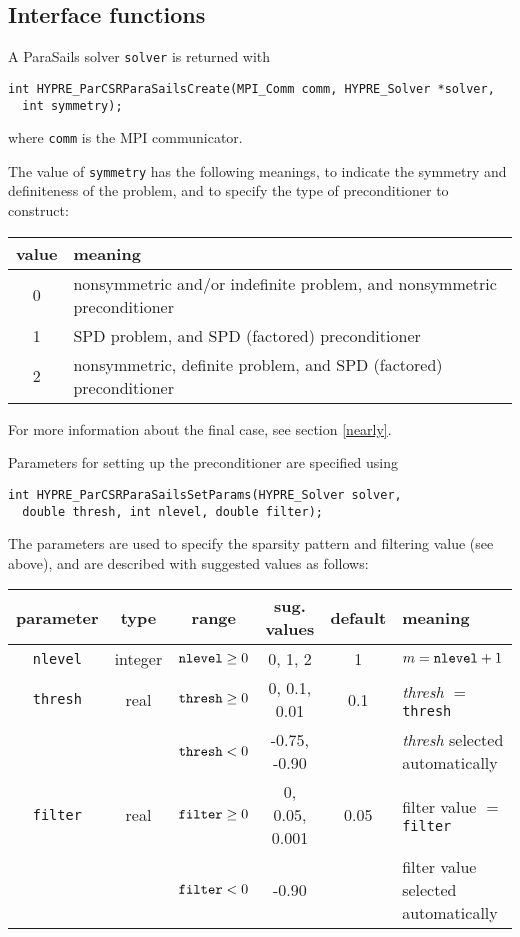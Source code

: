 \subsection{Interface functions}

A ParaSails solver {\tt solver} is returned with 
\begin{display}
\begin{verbatim}
int HYPRE_ParCSRParaSailsCreate(MPI_Comm comm, HYPRE_Solver *solver,
  int symmetry);
\end{verbatim}
\end{display}
where {\tt comm} is the MPI communicator.

The value of {\tt symmetry} has the following meanings, to indicate
the symmetry and definiteness of the problem, and to specify the 
type of preconditioner to construct:
\begin{center}
\begin{tabular}{|c|l|} \hline
value & meaning \\ \hline
0 & nonsymmetric and/or indefinite problem, and nonsymmetric preconditioner \\
1 & SPD problem, and SPD (factored) preconditioner \\
2 & nonsymmetric, definite problem, and SPD (factored) preconditioner \\ 
\hline
\end{tabular}
\end{center}
For more information about the final case, see section \ref{nearly}.

Parameters for setting up the preconditioner are specified using
\begin{display}
\begin{verbatim}
int HYPRE_ParCSRParaSailsSetParams(HYPRE_Solver solver, 
  double thresh, int nlevel, double filter);
\end{verbatim}
\end{display}

The parameters are used to specify the sparsity pattern and filtering value
(see above), and are described with suggested values as follows:

\begin{center}
\begin{tabular}{|c|c|c|c|c|l|} \hline
parameter    & type    & range                & sug. values  & default & meaning \\ \hline
{\tt nlevel} & integer & ${\tt nlevel} \ge 0$ & 0, 1, 2      & 1   & $m={\tt nlevel}+1$\\
\hline
{\tt thresh} & real    & ${\tt thresh} \ge 0$ & 0, 0.1, 0.01 & 0.1 & {\em thresh} $=$ {\tt thresh}\\
             &         & ${\tt thresh}  <  0$ & -0.75, -0.90 &     & {\em thresh} selected automatically\\
\hline
{\tt filter} & real    & ${\tt filter} \ge 0$ & 0, 0.05, 0.001 & 0.05 & filter value $=$ {\tt filter}\\
             &         & ${\tt filter}  <  0$ & -0.90        &     & filter value selected automatically\\
\hline
\end{tabular}
\end{center}

